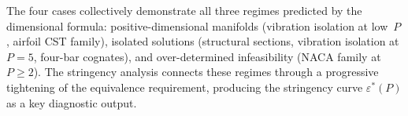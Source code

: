 The four cases collectively demonstrate all three regimes predicted by the dimensional formula: positive-dimensional manifolds (vibration isolation at low~$P$, airfoil CST family), isolated solutions (structural sections, vibration isolation at $P = 5$, four-bar cognates), and over-determined infeasibility (NACA family at $P \geq 2$). The stringency analysis connects these regimes through a progressive tightening of the equivalence requirement, producing the stringency curve $\varepsilon^*(P)$ as a key diagnostic output.
